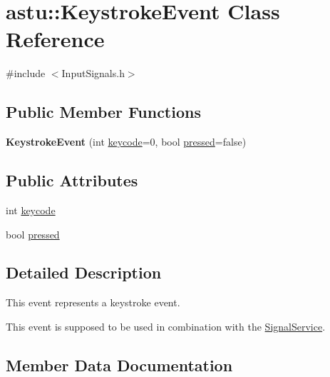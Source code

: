 \hypertarget{classastu_1_1KeystrokeEvent}{}\section{astu\+:\+:Keystroke\+Event Class Reference}
\label{classastu_1_1KeystrokeEvent}


{\ttfamily \#include $<$Input\+Signals.\+h$>$}

\subsection*{Public Member Functions}
\begin{DoxyCompactItemize}
\item 
\mbox{\label{classastu_1_1KeystrokeEvent_a5db82fbff58deea48bb1dcc78f103776}} 
{\bfseries Keystroke\+Event} (int \hyperlink{classastu_1_1KeystrokeEvent_aa389eb1a97d0cbbdcbdd8e3b45d6f32b}{keycode}=0, bool \hyperlink{classastu_1_1KeystrokeEvent_aa1623c59df97fda83abf305ee1a36cb9}{pressed}=false)
\end{DoxyCompactItemize}
\subsection*{Public Attributes}
\begin{DoxyCompactItemize}
\item 
int \hyperlink{classastu_1_1KeystrokeEvent_aa389eb1a97d0cbbdcbdd8e3b45d6f32b}{keycode}
\item 
bool \hyperlink{classastu_1_1KeystrokeEvent_aa1623c59df97fda83abf305ee1a36cb9}{pressed}
\end{DoxyCompactItemize}


\subsection{Detailed Description}
This event represents a keystroke event.

This event is supposed to be used in combination with the \hyperlink{classastu_1_1SignalService}{Signal\+Service}. 

\subsection{Member Data Documentation}
\mbox{\label{classastu_1_1KeystrokeEvent_aa389eb1a97d0cbbdcbdd8e3b45d6f32b}} 
